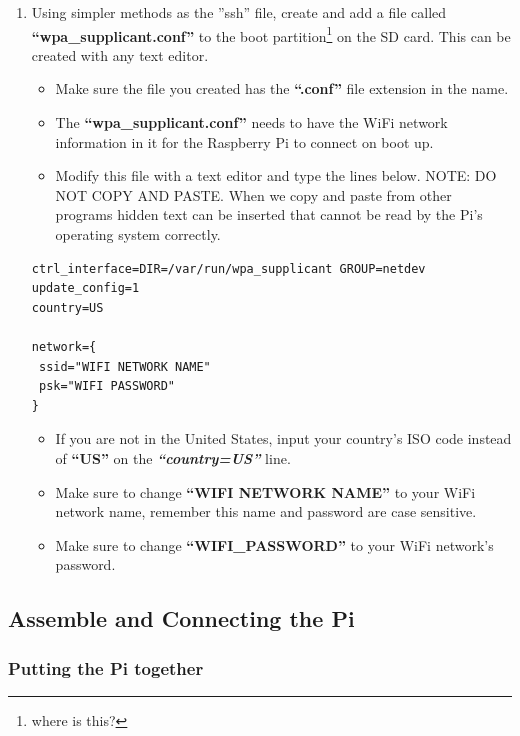 \documentclass{article}
\begin{document}
\begin{enumerate}
  \item Using simpler methods as the ''ssh'' file, create and add a file called \textbf{``wpa\_supplicant.conf''} to the boot partition\footnote{where is this?} on the SD card. This can be created with any text editor. %
  \begin{itemize}
  \item Make sure the file you created has the \textbf{``.conf''} file extension in the name.
  \item The \textbf{``wpa\_supplicant.conf''} needs to have the WiFi network information in it for the Raspberry Pi to connect on boot up.
  \item Modify this file with a text editor and type the lines below. NOTE: DO NOT COPY AND PASTE. When we copy and paste from other programs hidden text can be inserted that cannot be read by the Pi's operating system correctly.
  \end{itemize}

\begin{lstlisting}
ctrl_interface=DIR=/var/run/wpa_supplicant GROUP=netdev
update_config=1
country=US

network={
 ssid="WIFI NETWORK NAME"
 psk="WIFI PASSWORD"
}
\end{lstlisting}

  \begin{itemize}
  \item If you are not in the United States, input your country's ISO code instead of \textbf{``US''} on the \textbf{\textit{``country=US''}} line.
  \item Make sure to change \textbf{``WIFI NETWORK NAME''} to your WiFi network name, remember this name and password are case sensitive.
  \item Make sure to change \textbf{``WIFI\_PASSWORD''} to your WiFi network's password.
  \end{itemize}
  
\end{enumerate}

\subsection{Assemble and Connecting the Pi}

\subsubsection{Putting the Pi together}
\end{document}
